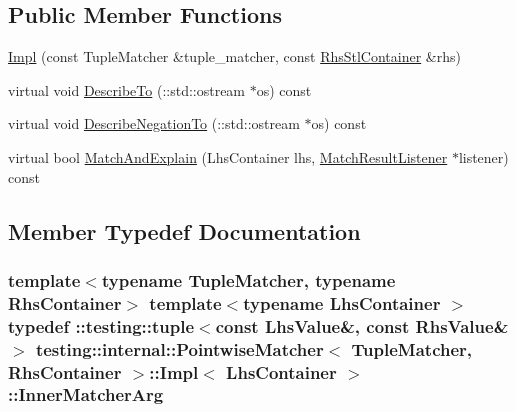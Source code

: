 \subsection*{Public Member Functions}
\begin{DoxyCompactItemize}
\item 
\hyperlink{classtesting_1_1internal_1_1PointwiseMatcher_1_1Impl_aaf6841b254ef78395919dfc5705dd152}{Impl} (const Tuple\+Matcher \&tuple\+\_\+matcher, const \hyperlink{classtesting_1_1internal_1_1PointwiseMatcher_aadbaec8c93351f29b103816c2e397edd}{Rhs\+Stl\+Container} \&rhs)
\item 
virtual void \hyperlink{classtesting_1_1internal_1_1PointwiseMatcher_1_1Impl_a34f78176359346ba3fd46c7e4c7b08cf}{Describe\+To} (\+::std\+::ostream $\ast$os) const 
\item 
virtual void \hyperlink{classtesting_1_1internal_1_1PointwiseMatcher_1_1Impl_a2098bacac67c13d29709d357033e2d3a}{Describe\+Negation\+To} (\+::std\+::ostream $\ast$os) const 
\item 
virtual bool \hyperlink{classtesting_1_1internal_1_1PointwiseMatcher_1_1Impl_ad3cad1e0b3e5d3a204c5b0f5a95d178b}{Match\+And\+Explain} (Lhs\+Container lhs, \hyperlink{classtesting_1_1MatchResultListener}{Match\+Result\+Listener} $\ast$listener) const 
\end{DoxyCompactItemize}


\subsection{Member Typedef Documentation}
\subsubsection[{\texorpdfstring{Inner\+Matcher\+Arg}{InnerMatcherArg}}]{\setlength{\rightskip}{0pt plus 5cm}template$<$typename Tuple\+Matcher, typename Rhs\+Container$>$ template$<$typename Lhs\+Container $>$ typedef \+::testing\+::tuple$<$const {\bf Lhs\+Value}\&, const {\bf Rhs\+Value}\&$>$ {\bf testing\+::internal\+::\+Pointwise\+Matcher}$<$ Tuple\+Matcher, Rhs\+Container $>$\+::{\bf Impl}$<$ Lhs\+Container $>$\+::{\bf Inner\+Matcher\+Arg}}\hypertarget{classtesting_1_1internal_1_1PointwiseMatcher_1_1Impl_aba9d983881cbfbb37724b8b40e863898}{}\label{classtesting_1_1internal_1_1PointwiseMatcher_1_1Impl_aba9d983881cbfbb37724b8b40e863898}
